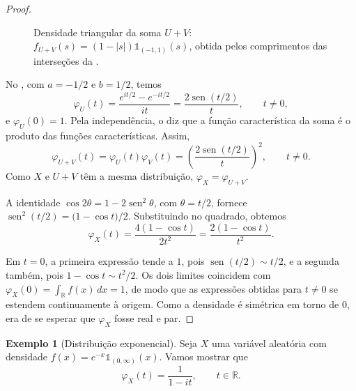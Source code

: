 \documentclass[12pt,portuguese]{article}
\theoremstyle{definition}
\newtheorem{example}[example]{Exemplo}
\theoremstyle{plainexercise}
\theoremstyle{starredexercise}
\theoremstyle{definition}
\renewcommand{\sin}{\operatorname{sen}}
\begin{document}
\begin{proof}
\begin{figure}[H]
\caption{Densidade triangular da soma $U+V$: $f_{U+V}(s)=(1-|s|)\mathds{1}_{(-1,1)}(s)$, obtida pelos comprimentos das interseções da .}
\label{fig:densidade-triangular}
\end{figure}

No , com $a=-1/2$ e $b=1/2$, temos 
\[
\varphi_U(t)=\frac{e^{it/2}-e^{-it/2}}{it}
=\frac{2\sin(t/2)}{t}, \qquad t\neq0,
\]
e $\varphi_U(0)=1$. Pela independência,
o  diz que a função característica da soma é o
produto das funções características. Assim,
\[
\varphi_{U+V}(t)
=\varphi_U(t)\varphi_V(t)
=\left(\frac{2\sin(t/2)}{t}\right)^{2}, \qquad t\neq0.
\]
Como $X$ e $U+V$ têm a mesma distribuição, $\varphi_X=\varphi_{U+V}$.

A identidade $\cos 2\theta=1-2\sin^{2}\theta$, com $\theta=t/2$, fornece
$\sin^{2}(t/2)=\bigl(1-\cos t\bigr)/2$. Substituindo no quadrado, obtemos
\[
\varphi_X(t)=\frac{4(1-\cos t)}{2t^{2}}
=\frac{2(1-\cos t)}{t^{2}}.
\]

Em $t=0$, a primeira expressão tende a $1$, pois $\sin(t/2)\sim t/2$, e a
segunda também, pois $1-\cos t\sim t^{2}/2$. Os dois limites coincidem com
$\varphi_X(0)=\int_{\mathbb{R}}f(x)\,dx=1$, de modo que as expressões obtidas
para $t\neq0$ se estendem continuamente à origem. Como a densidade é simétrica
em torno de $0$, era de se esperar que $\varphi_X$ fosse real e par.
\end{proof}

\medskip

\begin{example}[Distribuição exponencial]\label{ex:exponencial}
Seja $X$ uma variável aleatória com densidade
$f(x)=e^{-x}\mathds{1}_{(0,\infty)}(x)$. Vamos mostrar que
\[
\varphi_X(t)=\frac{1}{1-it}, \qquad t\in\mathbb{R}.
\]
\end{example}
\end{document}
